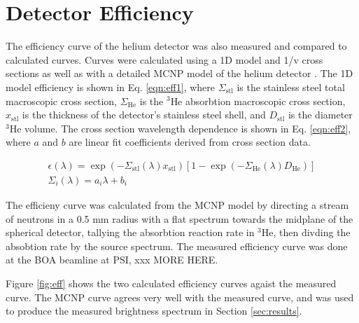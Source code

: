 \documentclass[preprint,12pt]{elsarticle}
\begin{document}
\section{Detector Efficiency}
\label{sec:eff}

The efficiency curve of the helium detector was also measured and compared to calculated curves.  Curves were calculated using a 1D model and 1/v cross sections as well as with a detailed MCNP model of the helium detector \cite{bonner_manual}.  The 1D model efficiency is shown in Eq. \ref{eqn:eff1}, where $\Sigma_{\textrm{stl}}$ is the stainless steel total macroscopic cross section, $\Sigma_{\textrm{He}}$ is the $^3$He absorbtion macroscopic cross section, $x_{\textrm{stl}}$ is the thickness of the detector's stainless steel shell, and  $D_{\textrm{stl}}$ is the diameter $^3$He volume.  The cross section wavelength dependence is shown in Eq. \ref{eqn:eff2}, where $a$ and $b$ are linear fit coefficients derived from cross section data.  

\begin{gather}
     \label{eqn:eff1} \epsilon(\lambda) = \exp \left(-\Sigma_{\textrm{stl}}(\lambda) x_{\textrm{stl}}\right)[1-\exp(-\Sigma_{\textrm{He}}(\lambda) D_{\textrm{He}})] \\
     \label{eqn:eff2} \Sigma_i(\lambda) = a_i\lambda+b_i
\end{gather}

The efficieny curve was calculated from the MCNP model by directing a stream of neutrons in a 0.5 mm radius with a flat spectrum towards the midplane of the spherical detector, tallying the absorbtion reaction rate in $^{3}$He, then divding the absobtion rate by the source spectrum.  The measured efficiency curve was done at the BOA beamline at PSI, xxx MORE HERE.

Figure \ref{fig:eff} shows the two calculated efficiency curves agaist the measured curve.  The MCNP curve agrees very well with the measured curve, and was used to produce the measured brightness spectrum in Section \ref{sec:results}.
\end{document}
